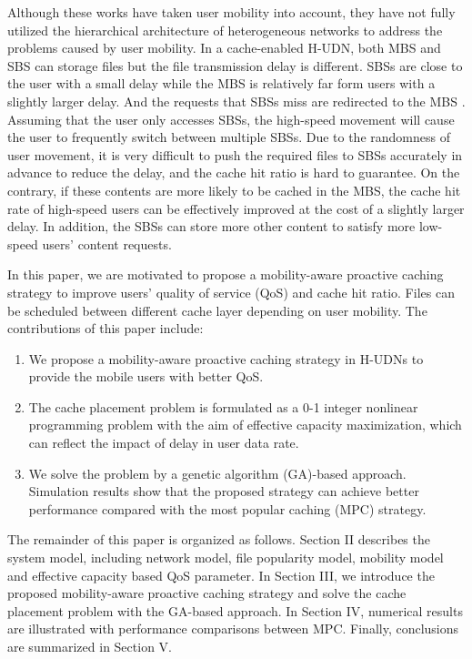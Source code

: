 \documentclass[conference]{IEEEtran}
\begin{document}
Although these works have taken user mobility into account, they have not fully utilized the hierarchical architecture of heterogeneous networks to address the problems caused by user mobility. In a cache-enabled H-UDN, both MBS and SBS can storage files but the file transmission delay is different. SBSs are close to the user with a small delay while the MBS is relatively far form users with a slightly larger delay. And the requests that SBSs miss are redirected to the MBS \cite{7484297}. Assuming that the user only accesses SBSs, the high-speed movement will cause the user to frequently switch between multiple SBSs. Due to the randomness of user movement, it is very difficult to push the required files to SBSs accurately in advance to reduce the delay, and the cache hit ratio is hard to guarantee. On the contrary, if these contents are more likely to be cached in the MBS, the cache hit rate of high-speed users can be effectively improved at the cost of a slightly larger delay. In addition, the SBSs can store more other content to satisfy more low-speed users' content requests.

In this paper, we are motivated to propose a mobility-aware proactive caching strategy to improve users’ quality of service (QoS) and cache hit ratio. Files can be scheduled between different cache layer depending on user mobility. The contributions of this paper include:

\begin{enumerate} [1)]
 \item We propose a mobility-aware proactive caching strategy in H-UDNs to provide the mobile users with better QoS.
 \item  The cache placement problem is formulated as a 0-1 integer nonlinear programming problem with the aim of effective capacity maximization, which can reflect the impact of delay in user data rate.
 \item We solve the problem by a genetic algorithm (GA)-based approach. Simulation results show that the proposed strategy can achieve better performance compared with the most popular caching (MPC) strategy.
\end{enumerate}

The remainder of this paper is organized as follows. Section II describes the system model, including network model, file popularity model, mobility model and effective capacity based QoS parameter. In Section III, we introduce the proposed mobility-aware proactive caching strategy and solve the cache placement problem with the GA-based approach. In Section IV, numerical results are illustrated with performance comparisons between MPC. Finally, conclusions are summarized in Section V.
\end{document}
